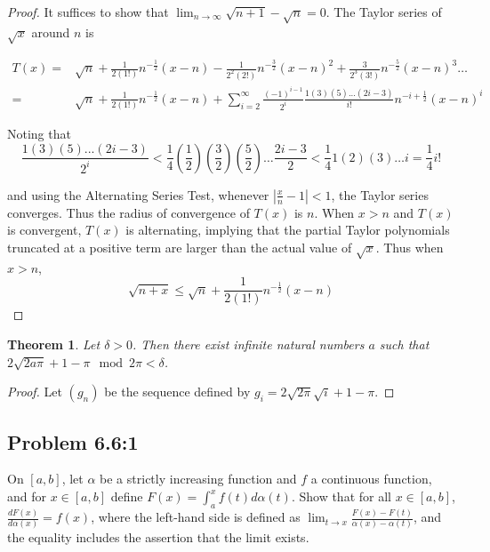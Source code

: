 \documentclass{amsart}
\newtheorem{theorem}{Theorem}[subsection]
\begin{document}
\begin{proof}
It suffices to show that $\lim_{n\rightarrow\infty} \sqrt{n+1} - \sqrt{n} = 0$. The Taylor series of $\sqrt{x}$ around $n$ is

\begin{align*}
T(x) = & \sqrt{n} + \frac{1}{2(1!)} n^{-\frac{1}{2}}(x-n)
- \frac{1}{2^2(2!)} n^{-\frac{3}{2}}(x-n)^2
+ \frac{3}{2^3(3!)} n^{-\frac{5}{2}}(x-n)^3 \dots \\
= &\sqrt{n} + \frac{1}{2(1!)} n^{-\frac{1}{2}}(x-n) + \sum_{i=2}^{\infty} \frac{(-1)^{i-1}}{2^i} \frac{1(3)(5)...(2i-3)}{i!} n^{-i + \frac{1}{2}}(x-n)^i
\end{align*}

Noting that
\[
\frac{1(3)(5)...(2i-3)}{2^i} < \frac{1}{4} \left(\frac{1}{2}\right)
\left(\frac{3}{2}\right)\left(\frac{5}{2}\right)\dots \frac{2i-3}{2} 
< \frac{1}{4} 1(2)(3)\dots i
= \frac{1}{4} i!
\]

and using the Alternating Series Test, whenever $|\frac{x}{n} - 1| < 1$, the Taylor series converges. Thus the radius of convergence of $T(x)$ is $n$. When $x > n$ and $T(x)$ is convergent, $T(x)$ is alternating, implying that the partial Taylor polynomials truncated at a positive term are larger than the actual value of $\sqrt{x}$. Thus when $x > n$,
\[
\sqrt{n+x} \leq \sqrt{n} + \frac{1}{2(1!)} n^{-\frac{1}{2}}(x-n)
\]

\end{proof}

\begin{theorem}
\label{NearCosine}
Let $\delta > 0$. Then there exist infinite natural numbers $a$ such that $2\sqrt{2a\pi} + 1 - \pi \mod 2\pi < \delta$. 
\end{theorem}
\begin{proof}
Let $(g_n)$ be the sequence defined by $g_i = 2\sqrt{2\pi}\sqrt{i} + 1 - \pi$. 
\end{proof}

\subsection*{Problem 6.6:1}

On $[a, b]$, let $\alpha$ be a strictly increasing function and $f$ a continuous function, and for $x \in [a, b]$ define $F(x) = \int_a^x f(t) d\alpha(t)$. Show that for all $x \in [a, b]$, $\frac{dF(x)}{d \alpha(x)} = f(x)$, where the left-hand side is defined as $\lim_{t \to x} \frac{F(x) - F(t)}{\alpha(x) - \alpha(t)}$, and the equality includes the assertion that the limit exists.
\end{document}

